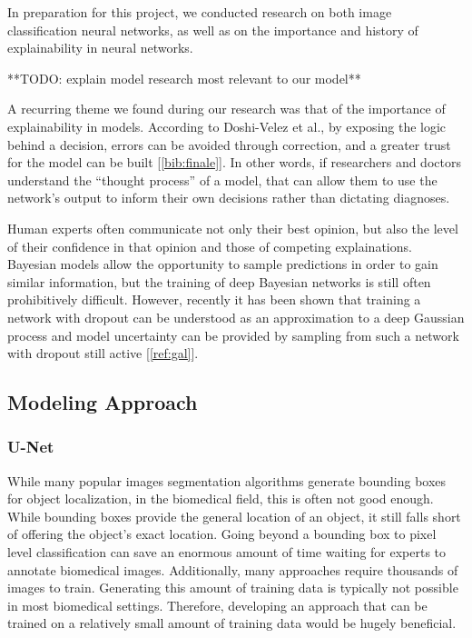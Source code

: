 \documentclass[12pt]{article}
\begin{document}
{In preparation for this project, we conducted research on both image classification neural networks, as well as on the importance and history of explainability in neural networks.

**TODO: explain model research most relevant to our model**

A recurring theme we found during our research was that of the importance of explainability in models. According to Doshi-Velez et al., by exposing the logic behind a decision, errors can be avoided through correction, and a greater trust for the model can be built [\ref{bib:finale}]. In other words, if researchers and doctors understand the ``thought process'' of a model,  that can allow them to use the network's output to inform their own decisions rather than dictating diagnoses. 

Human experts often communicate not only their best opinion, but also the level of their confidence in that opinion and those of competing explainations. Bayesian models allow the opportunity to sample predictions in order to gain similar information, but the training of deep Bayesian networks is still often prohibitively difficult. However, recently it has been shown that training a network with dropout can be understood as an approximation to a deep Gaussian process and model uncertainty can be provided by sampling from such a network with dropout still active {[}\ref{ref:gal}{]}.

\subsection*{Modeling Approach}

\subsubsection*{U-Net}
While many popular images segmentation algorithms generate bounding boxes for object localization, in the biomedical field, this is often not good enough. While bounding boxes provide the general location of an object, it still falls short of offering the object's exact location. Going beyond a bounding box to pixel level classification can save an enormous amount of time waiting for experts to annotate biomedical images. Additionally, many approaches require thousands of images to train. Generating this amount of training data is typically not possible in most biomedical settings. Therefore, developing an approach that can be trained on a relatively small amount of training data would be hugely beneficial.  

}
\end{document}
